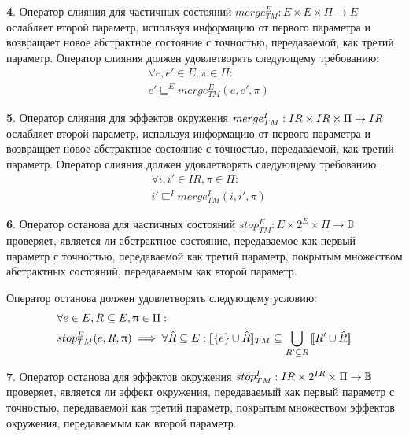 {\textbf 4.}
Оператор слияния для частичных состояний $merge^E_{TM}: E \times E \times \Pi \rightarrow E$ ослабляет второй параметр, используя информацию от первого параметра и возвращает новое абстрактное состояние с точностью, передаваемой, как третий параметр.
Оператор слияния должен удовлетворять следующему требованию:
\begin{equation}
\label{cpa_merge_tm_e_eq}
\begin{aligned}
&\forall e, e' \in E, \pi \in \Pi :\\
&e' \sqsubseteq^E merge^E_{TM}(e, e', \pi)
\end{aligned}
\end{equation}

{\textbf 5.}
Оператор слияния для эффектов окружения $merge^I_{TM}: IR \times IR \times \Pi \rightarrow IR$ ослабляет второй параметр, используя информацию от первого параметра и возвращает новое абстрактное состояние с точностью, передаваемой, как третий параметр.
Оператор слияния должен удовлетворять следующему требованию:
\begin{equation}
\label{cpa_merge_tm_i_eq}
\begin{aligned}
&\forall i, i' \in IR, \pi \in \Pi :\\
&i' \sqsubseteq^I merge^I_{TM}(i, i', \pi)
\end{aligned}
\end{equation}

{\textbf 6.} Оператор останова для частичных состояний $stop^E_{TM}: E \times 2^{E} \times \Pi \rightarrow \mathbb{B}$ проверяет, является ли абстрактное состояние, передаваемое как первый параметр с точностью, передаваемой как третий параметр, покрытым множеством абстрактных состояний, передаваемым как второй параметр.

Оператор останова должен удовлетворять следующему условию:
\begin{equation}
\label{cpa_stop_tm_e_eq}
\begin{aligned}
&\forall e \in E, R \subseteq E, \uppi \in \Pi:\\
&stop^E_{TM}(e, R, \uppi) \implies\forall \hat R \subseteq E: [\![ \{e\}\cup \hat R ]\!]_{TM} \subseteq \bigcup_{R'\subseteq R}{[\![ R' \cup \hat R ]\!]}
\end{aligned}
\end{equation}

{\textbf 7.} Оператор останова для эффектов окружения $stop^I_{TM}: IR \times 2^{IR} \times \Pi \rightarrow \mathbb{B}$ проверяет, является ли эффект окружения, передаваемый как первый параметр с точностью, передаваемой как третий параметр, покрытым множеством эффектов окружения, передаваемым как второй параметр.

